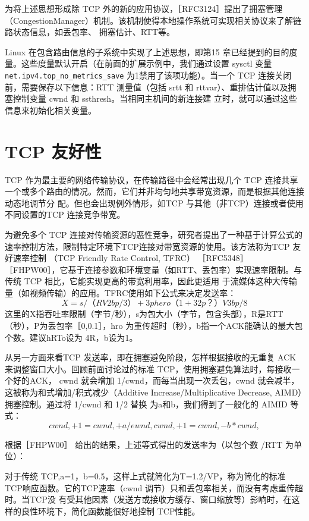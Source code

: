 为将上述思想形成除 TCP 外的新的应用协议，［RFC3124］提出了拥塞管理（CongestionManager）机制。该机制使得本地操作系统可实现相关协议来了解链路状态信息，如丢包率、
拥塞估计、RTT等。

Linux 在包含路由信息的子系统中实现了上述思想，即第15 章已经提到的目的度量。这些度量默认开启（在前面的扩展示例中，我们通过设置 sysctl 变量 \verb|net.ipv4.top_no_metrics_save|
为1禁用了该项功能）。当一个 TCP 连接关闭前，需要保存以下信息：RTT 测量值（包括 srtt 和 rttvar）、重排估计值以及拥塞控制变量 cwnd 和 ssthresh。当相同主机间的新连接建
立时，就可以通过这些信息来初始化相关变量。

\section{TCP 友好性}
TCP 作为最主要的网络传输协议，在传输路径中会经常出现几个 TCP 连接共享一个或多个路由的情况。然而，它们并非均匀地共享带宽资源，而是根据其他连接动态地调节分
配。但也会出现例外情形，如TCP 与其他（非TCP）连接或者使用不同设置的TCP 连接竞争带宽。

为避免多个 TCP 连接对传输资源的恶性竞争，研究者提出了一种基于计算公式的速率控制方法，限制特定环境下TCP连接对带宽资源的使用。该方法称为TCP 友好速率控制
（TCP Friendly Rate Control, TFRC） ［RFC5348］ ［FHPW00］，它基于连接参数和环境变量（如RTT、丢包率）实现速率限制。与传统 TCP 相比，它能实现更高的带宽利用率，因此更适用
于流媒体这种大传输量（如视频传输）的应用。TFRC使用如下公式来决定发送率：
\begin{equation}
    X=s/（R V2bp/3） + 3phero（1 + 32p？）V3bp/8
\end{equation}
这里的X指吞吐率限制（字节/秒），s为包大小（字节，包含头部），R是RTT（秒），P为丢包率［0,0.1］，hro 为重传超时（秒），b指一个ACK能确认的最大包个数。建议hRTo设为
4R，b设为1。

从另一方面来看TCP 发送率，即在拥塞避免阶段，怎样根据接收的无重复 ACK来调整窗口大小。回顾前面讨论过的标准 TCP，使用拥塞避免算法时，每接收一个好的ACK，
cwnd 就会增加 1/cwnd，而每当出现一次丢包，cwnd 就会减半，这被称为和式增加/积式减少（Additive Increase/Multiplicative Decrease, AIMD）拥塞控制。通过将 1/cwnd 和 1/2 替换
为a和b，我们得到了一般化的 AIMID 等式：
\begin{equation}
    cwnd, +1 = cwnd, + a/ewnd,
    cwnd, + 1 = cwnd, - b*cwnd,
\end{equation}

根据［FHPW00］ 给出的结果，上述等式得出的发送率为（以包个数 /RTT 为单位）：

对于传统 TCP,a=1，b=0.5，这样上式就简化为T=1.2/VP，称为简化的标准 TCP响应函数。它的TCP速率（cwnd 调节）只和丢包率相关，而没有考虑重传超时。当TCP没
有受其他因素（发送方或接收方缓存、窗口缩放等）影响时，在这样的良性环境下，简化函数能很好地控制 TCP性能。

